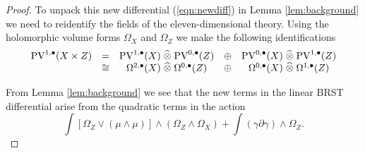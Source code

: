 \documentclass[11pt]{amsart}
\def\PV{{\rm PV}}
\begin{document}
\begin{proof}
To unpack this new differential (\ref{eqn:newdiff}) in Lemma \ref{lem:background} we need to reidentify the fields of the eleven-dimensional theory.
Using the holomorphic volume forms $\Omega_X$ and $\Omega_Z$ we make the following identifications
\begin{equation}\label{eqn:decomposevf}
\begin{array}{ccccc}
  \PV^{1,\bu}(X \times Z) & = & \PV^{1,\bu}(X) \; \Hat{\otimes} \; \PV^{0,\bu}(Z) & \oplus & \PV^{0,\bu}(X) \; \Hat{\otimes} \; \PV^{1,\bu}(Z) \\ & \cong & \Omega^{2,\bu}(X) \; \Hat{\otimes} \; \Omega^{0,\bu} (Z) & \oplus & \Omega^{0,\bu}(X) \; \Hat{\otimes} \; \Omega^{1,\bu}(Z) 
\end{array}
\end{equation}


From Lemma \ref{lem:background} we see that the new terms in the linear BRST differential arise from the quadratic terms in the action
\begin{equation}\label{eqn:newterms}
  \int \left[\Omega_Z \vee (\mu \wedge \mu) \right] \wedge (\Omega_Z \wedge \Omega_X) + \int \left(\gamma \partial \gamma\right) \wedge \Omega_Z .
\end{equation}


\end{proof}
\end{document}
